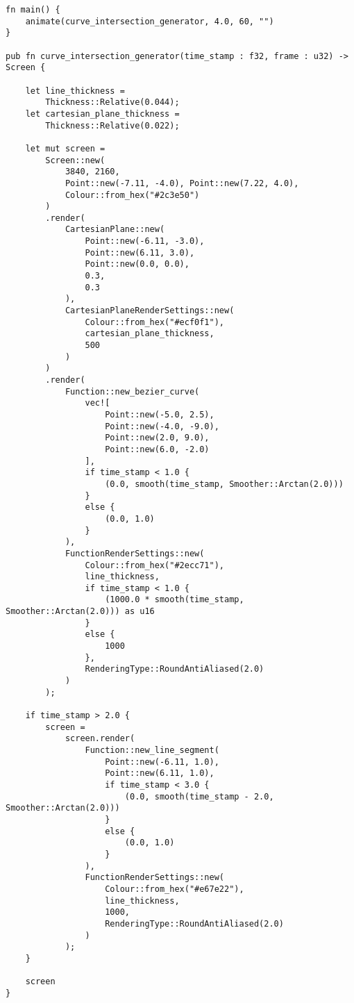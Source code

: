 \begin{lstlisting}
fn main() {
    animate(curve_intersection_generator, 4.0, 60, "")
}

pub fn curve_intersection_generator(time_stamp : f32, frame : u32) -> Screen {

    let line_thickness =
        Thickness::Relative(0.044);
    let cartesian_plane_thickness =
        Thickness::Relative(0.022);

    let mut screen =
        Screen::new(
            3840, 2160,
            Point::new(-7.11, -4.0), Point::new(7.22, 4.0),
            Colour::from_hex("#2c3e50")
        )
        .render(
            CartesianPlane::new(
                Point::new(-6.11, -3.0),
                Point::new(6.11, 3.0),
                Point::new(0.0, 0.0),
                0.3,
                0.3
            ),
            CartesianPlaneRenderSettings::new(
                Colour::from_hex("#ecf0f1"),
                cartesian_plane_thickness,
                500
            )
        )
        .render(
            Function::new_bezier_curve(
                vec![
                    Point::new(-5.0, 2.5),
                    Point::new(-4.0, -9.0),
                    Point::new(2.0, 9.0),
                    Point::new(6.0, -2.0)
                ],
                if time_stamp < 1.0 {
                    (0.0, smooth(time_stamp, Smoother::Arctan(2.0)))
                }
                else {
                    (0.0, 1.0)
                }
            ),
            FunctionRenderSettings::new(
                Colour::from_hex("#2ecc71"),
                line_thickness,
                if time_stamp < 1.0 {
                    (1000.0 * smooth(time_stamp, Smoother::Arctan(2.0))) as u16
                }
                else {
                    1000
                },
                RenderingType::RoundAntiAliased(2.0)
            )
        );

    if time_stamp > 2.0 {
        screen =
            screen.render(
                Function::new_line_segment(
                    Point::new(-6.11, 1.0),
                    Point::new(6.11, 1.0),
                    if time_stamp < 3.0 {
                        (0.0, smooth(time_stamp - 2.0, Smoother::Arctan(2.0)))
                    }
                    else {
                        (0.0, 1.0)
                    }
                ),
                FunctionRenderSettings::new(
                    Colour::from_hex("#e67e22"),
                    line_thickness,
                    1000,
                    RenderingType::RoundAntiAliased(2.0)
                )
            );
    }

    screen
}
\end{lstlisting}

